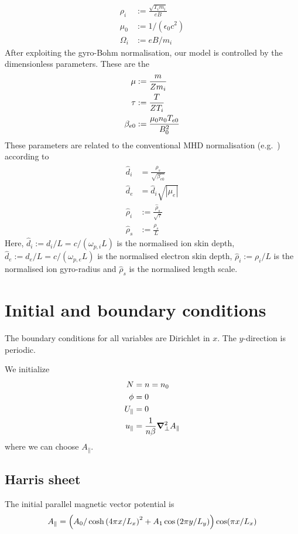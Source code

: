 \begin{align}
  \rho_{i}     &:= \frac{\sqrt{T_{i} m_i}}{e B} \\
  \mu_0 &:= 1/(\epsilon_0 c^2) \\
  \Omega_i &:= e B / m_i
\end{align}
After exploiting the gyro-Bohm normalisation, our model is controlled by the dimensionless parameters. These
are the
\begin{align}
 \mu   &:=  \frac{m}{Z m_i} \\ 
 \tau  &:=  \frac{T}{ Z T_i}\\
 \beta_{e0} &:=  \frac{\mu_0 n_0 T_{e0} }{ B_0^2 }
\end{align}
These parameters are related to the conventional MHD normalisation (e.g.~\cite{comisso13,zacharias14}) according to
\begin{align}
 \hat{d}_i &= \frac{\hat{\rho}_{s}}{\sqrt{\beta_{e0}}} \\
 \hat{d}_e &= \hat{d}_i \sqrt{|\mu_e|} \\
 \hat{\rho}_{i} &:= \frac{ \hat{\rho}_{s}}{\sqrt{\tau}}\\
 \hat{\rho}_{s} &:= \frac{\rho_{s}}{L}
\end{align}
Here, \(\hat{d}_i:=d_i/L=c/(\omega_{p,i} L)\) is the normalised ion skin depth, \(\hat{d}_e:=d_e/L=c/(\omega_{p,e} L)\) is the normalised electron skin depth, 
\(\hat{\rho}_{i}:=\rho_i/L\) is the normalised ion gyro-radius and \(\hat{\rho}_{s}\) is the normalised length scale.
\\


\section{Initial and boundary conditions}
The boundary conditions for all variables are Dirichlet in $x$.
The $y$-direction is periodic.

We initialize
\begin{align}
 N&=n =n_0 \\
 \phi &= 0 \\
  U_\parallel&=0 \\
  u_\parallel &= \frac{1}{n  \beta }{\boldsymbol{\nabla}}^2_{\perp} A_\parallel
\end{align}
where we can choose $A_\parallel$.
\subsection{Harris sheet}
The initial parallel magnetic vector potential is
\begin{align}
    A_\parallel =\left( A_0 / \cosh{( 4  \pi x / L_x )}^2 +A_1\cos{(2 \pi y/L_y)}\right) \cos( \pi x /L_x)
\end{align}
